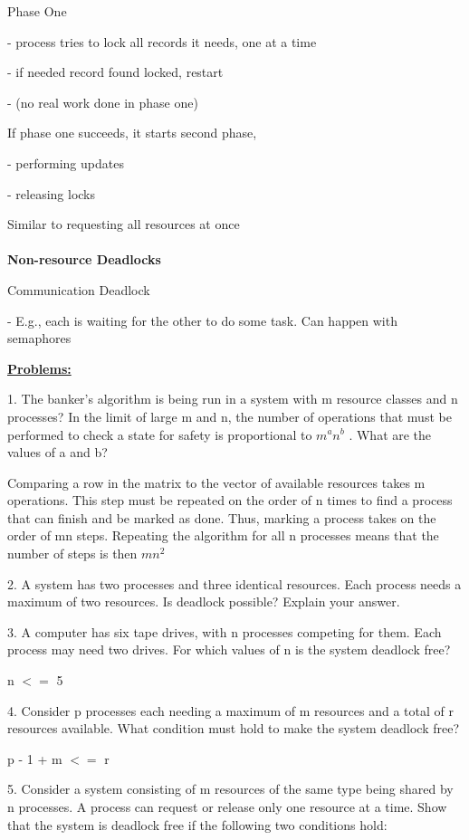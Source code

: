 \documentclass[]{report}
\begin{document}
Phase One

- process tries to lock all records it needs, one at a
time

- if needed record found locked, restart

- (no real work done in phase one)

If phase one succeeds, it starts second phase,

- performing updates

- releasing locks

Similar to requesting all resources at once
\\\\
\textbf{Non-resource Deadlocks}

Communication Deadlock

- E.g., each is waiting for the other to do some task. Can happen with semaphores

\textbf{\underline{Problems: }}

1. The banker’s algorithm is being run in a system
with m resource classes and n processes? In the
limit of large m and n, the number of operations
that must be performed to check a state for
safety is proportional to $m^an^b$ . What are the
values of a and b?

Comparing a row in the matrix to the vector of available resources takes m operations. This step must be repeated on the order of n times to find a process that can finish and be marked as done. Thus, marking a process takes on the order of mn steps. Repeating the algorithm for all n processes means that the number of steps is then $mn^2$

2. A system has two processes and three identical
resources. Each process needs a maximum of
two resources. Is deadlock possible? Explain
your answer.

3. A computer has six tape drives, with n
processes competing for them. Each process
may need two drives. For which values of n is
the system deadlock free?

n $<=$ 5

4. Consider p processes each needing a maximum
of m resources and a total of r resources
available. What condition must hold to make
the system deadlock free?

p - 1 + m $<=$ r

5. Consider a system consisting of m resources of the
same type being shared by n processes. A process can
request or release only one resource at a time. Show
that the system is deadlock free if the following two
conditions hold:
\end{document}
